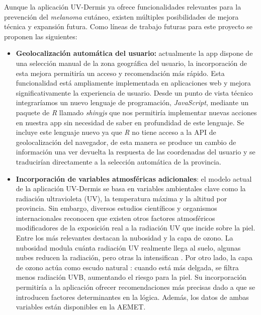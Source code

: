  Aunque la aplicación UV-Dermis ya ofrece  funcionalidades relevantes para la prevención del \textit{melanoma} cutáneo, existen múltiples posibilidades de mejora técnica y expansión futura. Como líneas de trabajo futuras para este proyecto se proponen las siguientes:
 \begin{itemize}
     \item \textbf{Geolocalización automática del usuario:} actualmente la app dispone de una selección manual de la zona geográfica del usuario, la incorporación de esta mejora permitiría un acceso y recomendación más rápido. Esta funcionalidad está ampliamente implementada en aplicaciones web y mejora significativamente la experiencia de usuario. Desde un punto de vista técnico integraríamos un nuevo lenguaje de programación, \textit{JavaScript}, mediante un paquete de \textit{R} llamado \textit{shinyjs} \cite{Shinyjs} que nos permitiría implementar nuevas acciones en nuestra app sin necesidad de saber en profundidad de este lenguaje. Se incluye este lenguaje nuevo ya que \textit{R} no tiene acceso a la API de geolocalización del navegador, de esta manera se produce un cambio de información una ver devuelta la respuesta de las coordenadas del usuario y se traducirían directamente a la selección automática de la provincia.
     \item \textbf{Incorporación de variables atmosféricas adicionales}: el modelo actual de la aplicación UV-Dermis se basa en variables ambientales clave como la radiación ultravioleta (UV), la temperatura máxima y la altitud por provincia. Sin embargo, diversos estudios científicos y organismos internacionales \cite{organizationGlobalSolarUV2002} reconocen que existen otros factores atmosféricos modificadores de la exposición real a la radiación UV que incide sobre la piel. Entre los más relevantes destacan la nubosidad y la capa de ozono. La nubosidad modula cuánta radiación UV realmente llega al suelo, algunas nubes reducen la radiación, pero otras la intensifican \cite{organizationGlobalSolarUV2002}. Por otro lado, la capa de ozono actúa como escudo natural \cite{UltravioletRadiationHow2001}: cuando está más delgada, se filtra menos radiación UVB, aumentando el riesgo para la piel. Su incorporación permitiría a la aplicación ofrecer recomendaciones más precisas dado a que se introducen factores determinantes en la lógica. Además, los datos de ambas variables están disponibles en la AEMET.

\end{itemize}

